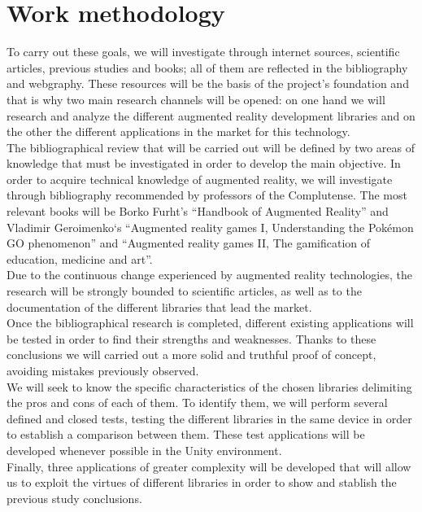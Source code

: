 \section*{Work methodology}
To carry out these goals, we will investigate through internet sources, scientific articles, previous studies and books; all of them are reflected in the bibliography and webgraphy. These resources will be the basis of the project's foundation and that is why two main research channels will be opened: on one hand we will research and analyze the different augmented reality development libraries and on the other the different applications in the market for this technology.\\


The bibliographical review that will be carried out will be defined by two areas of knowledge that must be investigated in order to develop the main objective. In order to acquire technical knowledge of augmented reality, we will investigate through bibliography recommended by professors of the Complutense. The most relevant books will be Borko Furht's “Handbook of Augmented Reality” and Vladimir Geroimenko‘s “Augmented reality games I, Understanding the Pokémon GO phenomenon” and “Augmented reality games II, The gamification of education, medicine and art”.\\

Due to the continuous change experienced by augmented reality technologies, the research will be strongly bounded to scientific articles, as well as to the documentation of the different libraries that lead the market.\\

Once the bibliographical research is completed, different existing applications will be tested in order to find their strengths and weaknesses. Thanks to these conclusions we will carried out a more solid and truthful proof of concept, avoiding mistakes previously observed.\\

We will seek to know the specific characteristics of the chosen libraries delimiting the pros and cons of each of them. To identify them, we will perform several defined and closed tests, testing the different libraries in the same device in order to establish a comparison between them. These test applications will be developed whenever possible in the Unity environment.\\

Finally, three applications of greater complexity will be developed that will allow us to exploit the virtues of different libraries in order to show and stablish the previous study conclusions.\\

